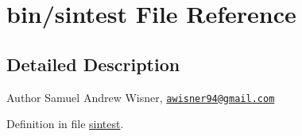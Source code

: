 \hypertarget{sintest}{\section{bin/sintest File Reference}
\label{sintest}
}


\subsection{Detailed Description}
\begin{DoxyAuthor}{Author}
Samuel Andrew Wisner, \href{mailto:awisner94@gmail.com}{\tt awisner94@gmail.\+com} 
\end{DoxyAuthor}


Definition in file \hyperlink{sintest_source}{sintest}.

